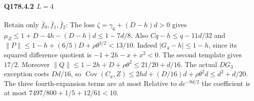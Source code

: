 \paragraph{Q178.4.2 $L=\allowbreak 4$}
Retain only $\bar f_0,\allowbreak \bar f_1,\allowbreak \bar f_2$:
The loss $\zeta=\allowbreak \gamma_6+(D-h)d>\allowbreak 0$ gives
$\mu_Z\le\allowbreak 1+D-4h-(D-h)d\le\allowbreak 1-7d/8$.
Also $Cq-h\le\allowbreak  q-11d/32$ and
$\|P\|\le\allowbreak 1-h+(6/5)D+\rho\theta^{3/2}<\allowbreak 13/10$.
Indeed $|G_4-h|\le\allowbreak 1-h$, since its squared difference quotient is
$-1+2h-x+x^2<\allowbreak 0$.
The second template gives $17/2$.
Moreover $\|Q\|\le\allowbreak 1-2h+D+\rho\theta^2\le\allowbreak 21/20+d/16$.
The actual $DG_3$ exception costs $Dd/16$, so
$\operatorname{Cov}(C_a,Z)\le2hd+(D/16)d+\rho\theta^2d
\le d^2+d/20$.
The three fourth-expansion terms are at most
Relative to $de^{-9d/2}$ the coefficient is at most
$7497/800+1/5+12/61<\allowbreak 10$.

